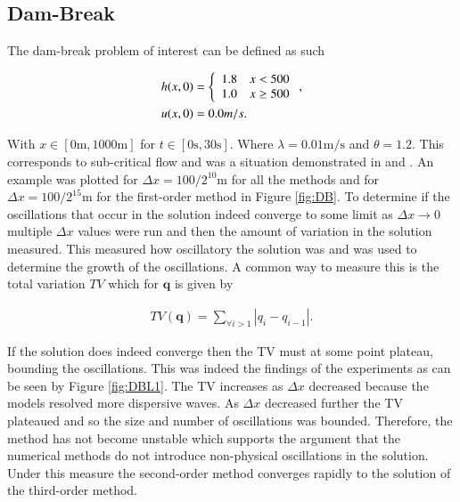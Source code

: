 \documentclass[SingleSpace,12pt,Proceedings]{Serre_ASCE}
\begin{document}
\subsection{Dam-Break}
The dam-break problem of interest can be defined as such
\begin{linenomath*}
\begin{gather*}
\begin{split}
h(x,0) &= \left\lbrace \begin{array}{c c}
1.8 & x < 500\\
1.0 & x \ge 500\\
\end{array} \right. ,\\
u(x,0) &= 0.0m/s.
\end{split}
\end{gather*}
\end{linenomath*}
With $x \in \left[0\text{m},1000\text{m}\right]$ for $t \in \left[0\text{s},30\text{s}\right]$. Where $\lambda = 0.01 \text{m/s}$ and $\theta = 1.2$. This corresponds to sub-critical flow and was a situation demonstrated in  and . An example was plotted for $\Delta x = 100 /2^{10}\text{m}$ for all the methods and for $\Delta x = 100 /2^{15}\text{m}$ for the first-order method in Figure \ref{fig:DB}. To determine if the oscillations that occur in the solution indeed converge to some limit as $\Delta x \rightarrow 0$ multiple $\Delta x$ values were run and then the amount of variation in the solution measured. This measured how oscillatory the solution was and was used to determine the growth of the oscillations. A common way to measure this is the total variation $TV$ \cite{LeVeque-2002} which for $\boldsymbol{q}$ is given by
\begin{linenomath*}
\begin{gather*}
TV(\boldsymbol{q}) = \sum_{\forall i >1} |q_{i} - q_{i-1}|.
\end{gather*}
\end{linenomath*}
If the solution does indeed converge then the TV must at some point plateau, bounding the oscillations. This was indeed the findings of the experiments as can be seen by Figure \ref{fig:DBL1}. The TV increases as $\Delta x$ decreased because the models resolved more dispersive waves. As $\Delta x$ decreased further the TV plateaued and so the size and number of oscillations was bounded. Therefore, the method has not become unstable which supports the argument that the numerical methods do not introduce non-physical oscillations in the solution. Under this measure the second-order method converges rapidly to the solution of the third-order method.
\end{document}
